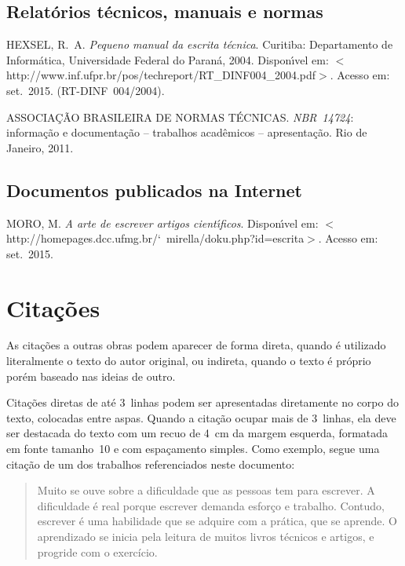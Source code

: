 \documentclass{ifsultcc}
\begin{document}
\begin{flushleft}
\subsection{Relatórios técnicos, manuais e normas}
\begin{list}{}
	\item HEXSEL, R.~A\@. \emph{Pequeno manual da
  escrita técnica}. Curitiba: Departamento de Informática, Universidade
  Federal do Paraná, 2004. Dispon{\'\i}vel em:
  $<$http://www.inf.ufpr.br/pos/techreport/RT\_DINF004\_2004.pdf$>$. Acesso em:
  set.~2015. (RT-DINF~004/2004).\\[4ex]
  	\item \MakeUppercase{Associação Brasileira de Normas Técnicas}.
  \emph{{NBR}~14724}: informação e documentação -- trabalhos acadêmicos --
  apresentação. Rio de Janeiro, 2011.
\end{list}

\subsection{Documentos publicados na Internet}
\begin{list}{}
	\item MORO, M\@. \emph{A arte de escrever artigos
  cient{\'\i}ficos}. Dispon{\'\i}vel em:
  $<$http://homepages.dcc.ufmg.br/{\char`~}mirella/doku.php?id=escrita$>$.
  Acesso em: set.~2015.
\end{list}
\end{flushleft}

\section{Citações}
As citações a outras obras podem aparecer de forma direta, quando é utilizado literalmente o texto do autor original, ou indireta, quando o texto é próprio porém baseado nas ideias de outro.

Citações diretas de até 3~linhas podem ser apresentadas diretamente no corpo do texto, colocadas entre aspas.  Quando a citação ocupar mais de 3~linhas, ela deve ser destacada do texto com um recuo de 4~cm da margem esquerda, formatada em fonte tamanho~10 e com espaçamento simples.  Como exemplo, segue uma citação de um dos trabalhos referenciados neste documento:
\begin{quote}
Muito se ouve sobre a dificuldade que as pessoas tem para escrever. A dificuldade é real porque escrever demanda esforço e trabalho. Contudo, escrever é uma habilidade que se adquire com a prática, que se aprende. O aprendizado se inicia pela leitura de muitos livros técnicos e artigos, e progride com o exercício. \cite{Hexsel04}
\end{quote}
\end{document}
